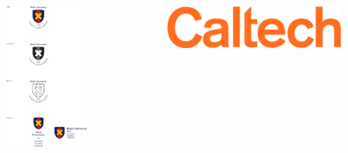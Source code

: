\documentclass{beamer}
\begin{document}
\begin{frame}[fragile]
\begin{columns}[T]
\begin{column}{.135\textwidth}
\begin{figure}
\begin{center}
\hspace{5cm}
\includegraphics[width=0.5\linewidth]{img/KeioLogoEmb-color.pdf} 
\end{center}
\end{figure}
\end{column}

\begin{column}{.135\textwidth}
\begin{figure}
\vspace{2cm}
\includegraphics[width=0.8\linewidth]{img/caltech.png}
\end{figure}
\end{column}

\end{columns}

\end{frame}
\end{document}
